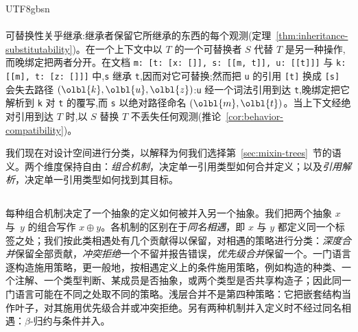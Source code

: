 \begin{CJK*}{UTF8}{gbsn}
\paragraph{}
可替换性关乎继承:继承者保留它所继承的东西的每个观测(定理~\ref{thm:inheritance-substitutability})。在一个上下文中以 $T$ 的一个可替换者 $S$ 代替 $T$ 是另一种操作,而晚绑定把两者分开。在文档 \texttt{m: [t: [x: []], s: [[m, t]], u: [[t]]]} 与 \texttt{k: [[m], t: [z: []]]} 中,\texttt{s} 继承 \texttt{t},因而对它可替换;然而把 \texttt{u} 的引用 \texttt{[t]} 换成 \texttt{[s]} 会失去路径 $(\olbl{k}, \olbl{u}, \olbl{z})$:\texttt{u} 经一个词法引用到达 \texttt{t},晚绑定把它解析到 \texttt{k} 对 \texttt{t} 的覆写,而 \texttt{s} 以绝对路径命名 $(\olbl{m}, \olbl{t})$。当上下文经绝对引用到达 $T$ 时,以 $S$ 替换 $T$ 不丢失任何观测(推论~\ref{cor:behavior-compatibility})。

我们现在对设计空间进行分类，以解释为何我们选择第~\ref{sec:mixin-trees}~节的语义。两个维度保持自由：\emph{组合机制}，决定单一引用类型如何合并定义；以及\emph{引用解析}，决定单一引用类型如何找到其目标。

\subsection*{}

每种组合机制决定了一个抽象的定义如何被并入另一个抽象。我们把两个抽象 $x$ 与~$y$ 的组合写作 $x \oplus y$。各机制的区别在于\emph{同名相遇}，即 $x$ 与 $y$ 都定义同一个标签之处；我们按此类相遇处有几个贡献得以保留，对相遇的策略进行分类：\emph{深度合并}保留全部贡献，\emph{冲突拒绝}一个不留并报告错误，\emph{优先级合并}保留一个。一门语言逐构造施用策略，更一般地，按相遇定义上的条件施用策略，例如构造的种类、一个注解、一个类型判断、某成员是否抽象，或两个类型是否共享构造子；因此同一门语言可能在不同之处取不同的策略。浅层合并不是第四种策略：它把嵌套结构当作叶子，对其施用优先级合并或冲突拒绝。另有两种机制并入定义时不经过同名相遇：$\beta$-归约与条件并入。


\end{CJK*}
